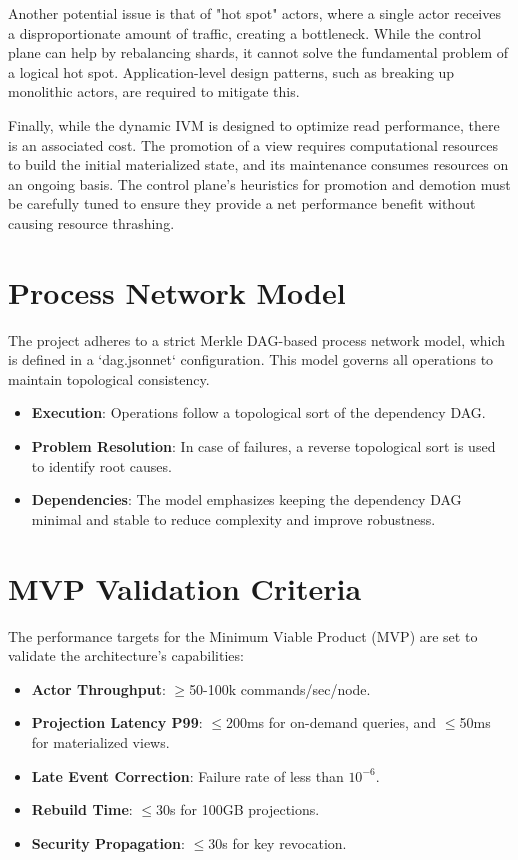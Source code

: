 \documentclass{article}
\begin{document}
Another potential issue is that of "hot spot" actors, where a single actor receives a disproportionate amount of traffic, creating a bottleneck. While the control plane can help by rebalancing shards, it cannot solve the fundamental problem of a logical hot spot. Application-level design patterns, such as breaking up monolithic actors, are required to mitigate this.

Finally, while the dynamic IVM is designed to optimize read performance, there is an associated cost. The promotion of a view requires computational resources to build the initial materialized state, and its maintenance consumes resources on an ongoing basis. The control plane's heuristics for promotion and demotion must be carefully tuned to ensure they provide a net performance benefit without causing resource thrashing.

\section{Process Network Model}
The project adheres to a strict Merkle DAG-based process network model, which is defined in a `dag.jsonnet` configuration. This model governs all operations to maintain topological consistency.
\begin{itemize}
    \item \textbf{Execution}: Operations follow a topological sort of the dependency DAG.
    \item \textbf{Problem Resolution}: In case of failures, a reverse topological sort is used to identify root causes.
    \item \textbf{Dependencies}: The model emphasizes keeping the dependency DAG minimal and stable to reduce complexity and improve robustness.
\end{itemize}

\section{MVP Validation Criteria}
The performance targets for the Minimum Viable Product (MVP) are set to validate the architecture's capabilities:
\begin{itemize}
    \item \textbf{Actor Throughput}: $\geq$50-100k commands/sec/node.
    \item \textbf{Projection Latency P99}: $\leq$200ms for on-demand queries, and $\leq$50ms for materialized views.
    \item \textbf{Late Event Correction}: Failure rate of less than $10^{-6}$.
    \item \textbf{Rebuild Time}: $\leq$30s for 100GB projections.
    \item \textbf{Security Propagation}: $\leq$30s for key revocation.
\end{itemize}
\end{document}

